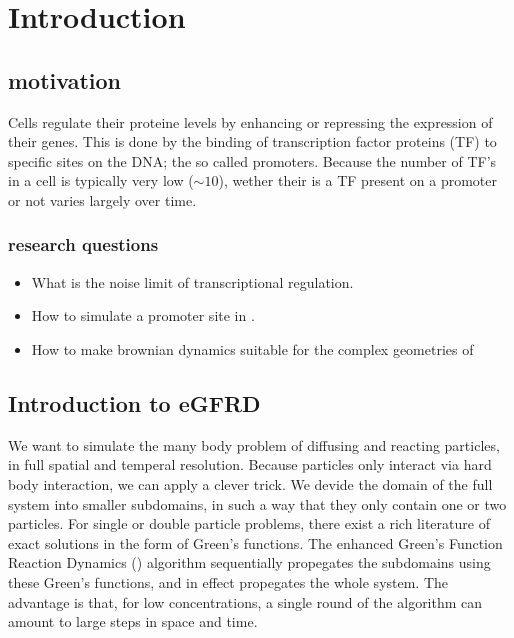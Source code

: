 \section{Introduction}



\subsection{motivation}
Cells regulate their proteine levels by enhancing or repressing the expression of their genes. This is done by the binding of transcription factor proteins (TF) to specific sites on the DNA; the so called promoters. Because the number of TF's in a cell is typically very low ($\sim 10$), wether their is a TF present on a promoter or not varies largely over time. 

\subsubsection{research questions}
\begin{itemize}
 \item What is the noise limit of transcriptional regulation.
 \item How to simulate a promoter site in \GFRD.
 \item How to make brownian dynamics suitable for the complex geometries of \GFRD
\end{itemize}



\subsection{Introduction to eGFRD}
We want to simulate the many body problem of diffusing and reacting particles, in full spatial and temperal resolution. Because particles only interact via hard body interaction, we can apply a clever trick. We devide the domain of the full system into smaller subdomains, in such a way that they only contain one or two particles. For single or double particle problems, there exist a rich literature of exact solutions in the form of Green's functions. The enhanced Green's Function Reaction Dynamics (\GFRD) algorithm sequentially propegates the subdomains using these Green's functions, and in effect propegates the whole system. \cite{VanZon2006}\cite{VanZon2005}\cite{Takahashi2010} The advantage is that, for low concentrations, a single round of the algorithm can amount to large steps in space and time. 

